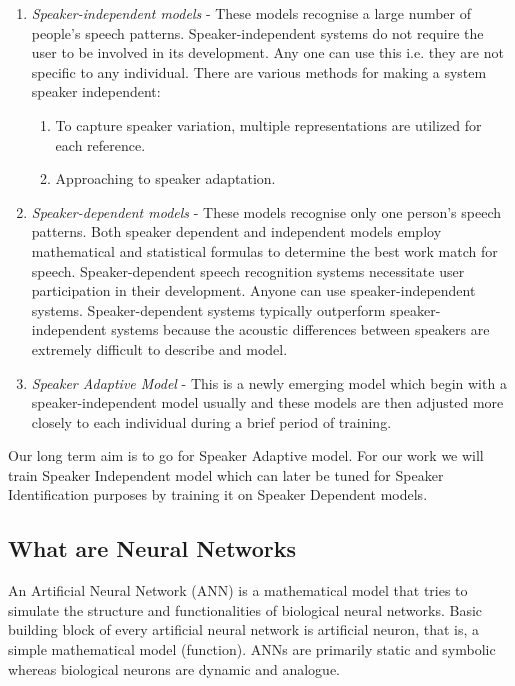 \begin{enumerate}
    \item \textit{Speaker-independent models} - These models recognise a large number of people's speech patterns. Speaker-independent systems do not require the user to be involved in its development. Any one can use this i.e. they are not specific to any individual. There are various methods for making a system speaker independent:
    \begin{enumerate}[label=(\alph*)]
        \item To capture speaker variation, multiple representations are utilized for each reference.
        \item Approaching to speaker adaptation.
    \end{enumerate}
    \item \textit{Speaker-dependent models} - These models recognise only one person's speech patterns. Both speaker dependent and independent models employ mathematical and statistical formulas to determine the best work match for speech. Speaker-dependent speech recognition systems necessitate user participation in their development. Anyone can use speaker-independent systems. Speaker-dependent systems typically outperform speaker-independent systems because the acoustic differences between speakers are extremely difficult to describe and model. 
    \item \textit{Speaker Adaptive Model} - This is a newly emerging model which begin with a speaker-independent model usually and these models are then adjusted more closely to each individual during a brief period of training.
\end{enumerate}

Our long term aim is to go for Speaker Adaptive model. For our work we will train Speaker Independent model which can later be tuned for Speaker Identification purposes by training it on Speaker Dependent models.


 
\subsection{What are Neural Networks}

An Artificial Neural Network (ANN) is a mathematical model that tries to simulate the structure and functionalities of biological neural networks. Basic building block of every artificial neural network is artificial neuron, that is, a simple mathematical model (function). ANNs are primarily static and symbolic whereas biological neurons are dynamic and analogue.

